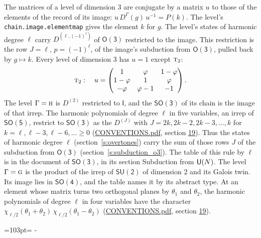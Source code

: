 \documentclass[10pt,a4paper]{article}
\newcommand{\needspace}[1]{\par\penalty-100\begingroup\dimen0=#1\relax\dimen2=\pagegoal
  \advance\dimen2-\pagetotal\ifdim\dimen0>\dimen2\relax\ifdim\dimen2>0pt\vfil\break\fi\fi
  \endgroup}
\numberwithin{equation}{section}
\newcommand{\grp}[1]{\mathsf{#1}}
\newcommand{\irr}[1]{\text{\normalfont\scshape #1}}
\newcommand{\goldenratio}{\varphi}
\newcommand{\irrJ}[1]{D^{(#1)}}
\newcommand{\irrJp}[2]{D^{(#1,#2)}}
\newcommand{\repD}[1]{D^{#1}}
\newcommand{\irchar}[1]{\chi_{#1}}
\begin{document}
\leavevmode\label{n:matrix.conjugator}The matrices of a level of dimension 3 are conjugate by a matrix $u$ to those of the elements of the record of its image: $u\,\repD{\Gamma}(g)\,u^{-1} = P(k)$. The level's \texttt{chain.image.elementmap} gives the element $k$ for $g$. \label{n:index.harmonic.degree}The level's states of harmonic degree $\ell$ carry $\irrJp{\ell}{(-1)^{\ell}}$ of \href{O3.pdf}{$\grp{O(3)}$} restricted to the image. This restriction is the row $J = \ell$, $p = (-1)^{\ell}$, of the image's subduction from \href{O3.pdf}{$\grp{O(3)}$}, pulled back by $g \mapsto k$.
Every level of dimension 3 has $u = 1$ except $\irr{t}_{2}$:
\begin{equation}\label{e:conjT2}\irr{t}_{2}:\quad u = \begin{pmatrix}1 & \goldenratio{} & 1 - \goldenratio{}\\1 - \goldenratio{} & 1 & \goldenratio{}\\-\goldenratio{} & \goldenratio - 1 & -1\end{pmatrix}.\end{equation}
The level $\Gamma = \irr{h}$ is $\irrJ{2}$ restricted to $\grp{I}$, and the \href{SO3.pdf}{$\grp{SO(3)}$} of its chain is the image of that irrep.
The harmonic polynomials of degree $\ell$ in five variables, an irrep of $\grp{SO(5)}$, restrict to \href{SO3.pdf}{$\grp{SO(3)}$} as the $\irrJ{J}$ with $J = 2k, 2k - 2, 2k - 3, \dots, k$ for $k = \ell, \ell - 3, \ell - 6, \dots \ge 0$ (\href{../../CONVENTIONS.pdf}{CONVENTIONS.pdf}, section \href{../../CONVENTIONS.pdf\#conv.19}{19}). Thus the states of harmonic degree $\ell$ (section~\ref{s:overtones}) carry the sum of those rows $J$ of the subduction from \href{O3.pdf}{$\grp{O(3)}$} (section~\ref{s:subduction_o3}). The table of this rule by $\ell$ is in the document of \href{SO3.pdf}{$\grp{SO(3)}$}, in its section Subduction from $\grp{U(\mathnormal{N})}$.
\leavevmode\label{n:group.su2}The level $\Gamma = \irr{g}$ is the product of the irrep of $\grp{SU(2)}$ of dimension 2 and its Galois twin. Its image lies in $\grp{SO(4)}$, and the table names it by its abstract type. \label{n:local.so4.angles}At an element whose matrix turns two orthogonal planes by $\theta_{1}$ and $\theta_{2}$, the harmonic polynomials of degree $\ell$ in four variables have the character $\irchar{\ell/2}(\theta_{1} + \theta_{2})\,\irchar{\ell/2}(\theta_{1} - \theta_{2})$ (\href{../../CONVENTIONS.pdf}{CONVENTIONS.pdf}, section \href{../../CONVENTIONS.pdf\#conv.19}{19}).
\needspace{103pt}
\end{document}
